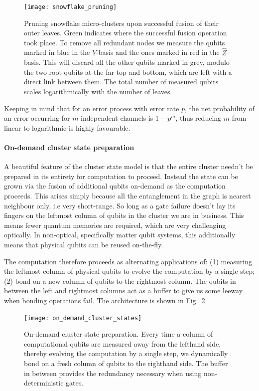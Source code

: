 \begin{figure}[!htb]
\texttt{[image: snowflake\_pruning]}
\caption{Pruning snowflake micro-clusters upon successful fusion of their outer leaves. Green indicates where the successful fusion operation took place. To remove all redundant nodes we measure the qubits marked in blue in the $\hat{Y}$-basis and the ones marked in red in the $\hat{Z}$ basis. This will discard all the other qubits marked in grey, modulo the two root qubits at the far top and bottom, which are left with a direct link between them. The total number of measured qubits scales logarithmically with the number of leaves.}\label{fig:snowflake_pruning}	
\end{figure}

Keeping in mind that for an error process with error rate $p$, the net probability of an error occurring for $m$ independent channels is \mbox{$1-p^m$}, thus reducing $m$ from linear to logarithmic is highly favourable.

%
%

\paragraph{On-demand cluster state preparation}

A beautiful feature of the cluster state model is that the entire cluster needn't be prepared in its entirety for computation to proceed. Instead the state can be grown via the fusion of additional qubits on-demand as the computation proceeds. This arises simply because all the entanglement in the graph is nearest neighbour only, i.e very short-range. So long as a gate failure doesn't lay its fingers on the leftmost column of qubits in the cluster we are in business. This means fewer quantum memories are required, which are very challenging optically. In non-optical, specifically matter qubit systems, this additionally means that physical qubits can be reused on-the-fly.

The computation therefore proceeds as alternating applications of: (1) measuring the leftmost column of physical qubits to evolve the computation by a single step; (2) bond on a new column of qubits to the rightmost column. The qubits in between the left and rightmost columns act as a buffer to give us some leeway when bonding operations fail. The architecture is shown in Fig.~\ref{fig:on_demand_cs}.

\begin{figure}[!htb]
\texttt{[image: on\_demand\_cluster\_states]}
\caption{On-demand cluster state preparation. Every time a column of computational qubits are measured away from the lefthand side, thereby evolving the computation by a single step, we dynamically bond on a fresh column of qubits to the righthand side. The buffer in between provides the redundancy necessary when using non-deterministic gates.}\label{fig:on_demand_cs}
\end{figure}


